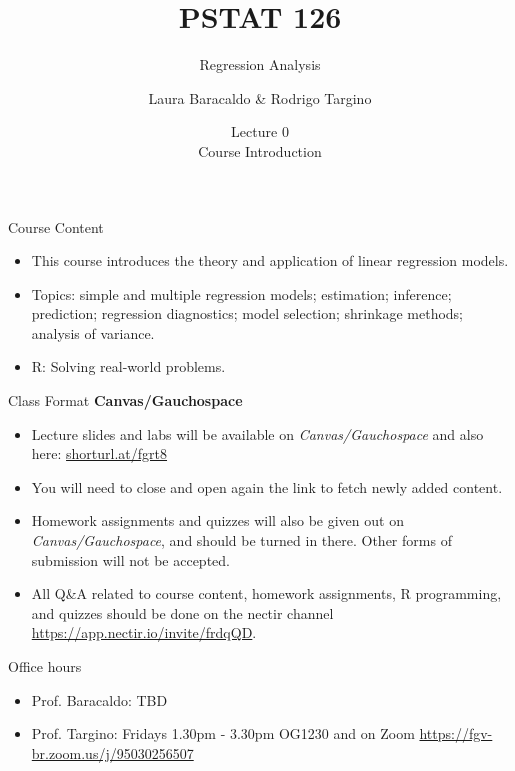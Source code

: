 \documentclass[10pt]{beamer}
\title[PSTAT 126: Regression Analysis]{PSTAT 126}%
\subtitle{Regression Analysis }%
\author[Laura Baracaldo \& Rodrigo Targino]{Laura Baracaldo \& Rodrigo Targino}%
\institute[UCSB]{}
\date[\textcolor{white}{Lecure 0: Course Introduction}]
{Lecture 0\\
Course Introduction}
\begin{document}
\frame{\titlepage}






\begin{frame}{Course Content}

\begin{itemize}
\large
    \item This course introduces the theory and application of linear regression models. 
    \item Topics: simple and multiple regression models; estimation; inference; prediction; regression diagnostics; model selection; shrinkage methods; analysis of variance. \item R: Solving real-world problems.
\end{itemize}

\end{frame}



\begin{frame}{Class Format}
\large
{\bf Canvas/Gauchospace}
\begin{itemize}

\item Lecture slides and labs will be available on {\em Canvas/Gauchospace} and also here:
\url{shorturl.at/fgrt8}
\item You will need to close and open again the link to fetch newly added content.
\item Homework assignments and quizzes will also be given out on {\em Canvas/Gauchospace}, and should be turned in there. Other forms of submission will not be accepted.
\item All Q\&A related to course content, homework assignments, R programming, and quizzes should
be done on the nectir channel \url{https://app.nectir.io/invite/frdqQD}.
\end{itemize}
\end{frame}

\begin{frame}{Office hours}
	\large
	\begin{itemize}
		\item Prof. Baracaldo: TBD
		\item Prof. Targino: Fridays 1.30pm - 3.30pm OG1230 and on Zoom \url{https://fgv-br.zoom.us/j/95030256507}
	\end{itemize}
\end{frame}
\end{document}
